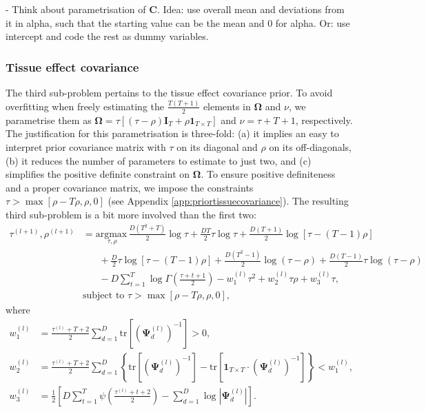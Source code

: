 \documentclass[a4paper,hidelinks]{article}\usepackage[]{graphicx}\usepackage[]{color}
\newcommand{\I}{\mathbf{I}}
\newcommand{\0}{\bm{0}}
\newcommand{\argmax}{\text{argmax} \,}
\newcommand{\trace}{\text{tr}}
\renewcommand{\(}{\left(}
\renewcommand{\)}{\right)}
\renewcommand{\[}{\left[}
\renewcommand{\]}{\right]}
\begin{document}
	- Think about parametrisation of $\mathbf{C}$. Idea: use overall mean and deviations from it in alpha, such that the starting value can be the mean and 0 for alpha. Or: use intercept and code the rest as dummy variables.
	
	\subsubsection{Tissue effect covariance}
	The third sub-problem pertains to the tissue effect covariance prior. To avoid overfitting when freely estimating the $\frac{T(T+1)}{2}$ elements in $\bm{\Omega}$ and $\nu$, we parametrise them as $\bm{\Omega}=  \tau [(\tau - \rho) \I_T + \rho \mathbf{1}_{T \times T}]$ and $\nu = \tau + T + 1$, respectively. The justification for this parametrisation is three-fold: (a) it implies an easy to interpret prior covariance matrix with $\tau$ on its diagonal and $\rho$ on its off-diagonals, (b) it reduces the number of parameters to  estimate to just two, and (c) simplifies the positive definite constraint on  $\bm{\Omega}$. To ensure positive definiteness and a proper covariance matrix, we impose the constraints $\tau > \max\[\rho - T \rho,\rho, 0\]$ (see Appendix \ref{app:priortissuecovariance}). The resulting third sub-problem is a bit more involved than the first two:
	\begin{align*}
	\tau^{(l + 1)}, \rho^{(l+1)} & = \underset{\tau, \rho}{\argmax} \frac{D (T^2 + T)}{2} \log \tau + \frac{DT}{2} \tau \log \tau + \frac{D(T+1)}{2} \log \[ \tau - (T - 1) \rho\] \\
	& \,\,\,\,\,\,\,\,\,\, + \frac{D}{2} \tau \log \[ \tau - (T - 1) \rho\] + \frac{D(T^2 - 1)}{2} \log(\tau - \rho) +\frac{D(T - 1)}{2} \tau  \log(\tau - \rho) \\
	& \,\,\,\,\,\,\,\,\,\, - D \sum_{t=1}^T \log \Gamma \( \frac{\tau + t + 1}{2} \) - w_1^{(l)} \tau^2 + w_2^{(l)} \tau \rho + w_3^{(l)} \tau, \\
	& \text{subject to } \tau > \max\[\rho - T \rho,\rho, 0\],
	\end{align*}
	where
	\begin{align*}
	w_1^{(l)} & =  \frac{\tau^{(l)} + T + 2}{2} \sum_{d=1}^D \trace \[ (\bm{\Psi}_d^{(l)})^{-1}\] > 0,\\
	w_2^{(l)} & = \frac{\tau^{(l)} + T + 2}{2} \sum_{d=1}^D \left\{\trace \[ (\bm{\Psi}_d^{(l)})^{-1}\] - \trace \[\mathbf{1}_{T \times T} \cdot (\bm{\Psi}_d^{(l)})^{-1}\] \right\} < w_1^{(l)},\\
	w_3^{(l)} & = \frac{1}{2} \[D \sum_{t=1}^T \psi\(\frac{\tau^{(l)} + t + 2}{2}\) - \sum_{d=1}^D \log |\bm{\Psi}_d^{(l)}| \].
	\end{align*}
	
\end{document}
